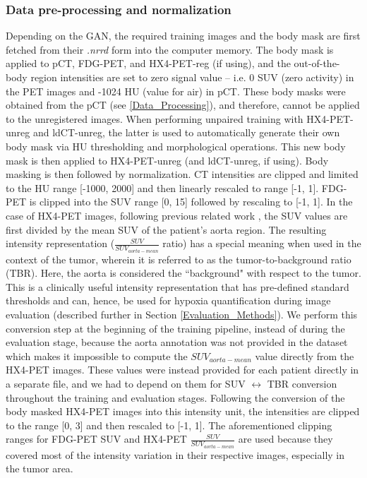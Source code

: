 \subsubsection{Data pre-processing and normalization}
Depending on the GAN, the required training images and the body mask are first fetched from their \textit{.nrrd} form into the computer memory. The body mask is applied to pCT, FDG-PET, and HX4-PET-reg (if using), and the out-of-the-body region intensities are set to zero signal value -- i.e. 0 SUV (zero activity) in the PET images and -1024 HU (value for air) in pCT. These body masks were obtained from the pCT (see \ref{Data_Processing}), and therefore, cannot be applied to the unregistered images. When performing unpaired training with HX4-PET-unreg and ldCT-unreg, the latter is used to automatically generate their own body mask via HU thresholding and morphological operations. This new body mask is then applied to HX4-PET-unreg (and ldCT-unreg, if using). Body masking is then followed by normalization. CT intensities are clipped and limited to the HU range [-1000, 2000] and then linearly rescaled to range [-1, 1]. FDG-PET is clipped into the SUV range [0, 15] followed by rescaling to [-1, 1]. In the case of HX4-PET images, following previous related work \cite{even2017predicting}, the SUV values are first divided by the mean SUV of the patient's aorta region. The resulting intensity representation ($\frac{SUV}{SUV_{aorta-mean}}$ ratio) has a special meaning when used in the context of the tumor, wherein it is referred to as the tumor-to-background ratio (TBR). Here, the aorta is considered the ``background" with respect to the tumor. This is a clinically useful intensity representation that has pre-defined standard thresholds \cite{zegers2013hypoxia} and can, hence, be used for hypoxia quantification during image evaluation (described further in Section \ref{Evaluation_Methods}). We perform this conversion step at the beginning of the training pipeline, instead of during the evaluation stage, because the aorta annotation was not provided in the dataset which makes it impossible to compute the $SUV_{aorta-mean}$ value directly from the HX4-PET images. These values were instead provided for each patient directly in a separate file, and we had to depend on them for SUV $\leftrightarrow$ TBR conversion throughout the training and evaluation stages. Following the conversion of the body masked HX4-PET images into this intensity unit, the intensities are clipped to the range [0, 3] and then rescaled to [-1, 1]. The aforementioned clipping ranges for FDG-PET SUV and HX4-PET $\frac{SUV}{SUV_{aorta-mean}}$ are used because they covered most of the intensity variation in their respective images, especially in the tumor area.

